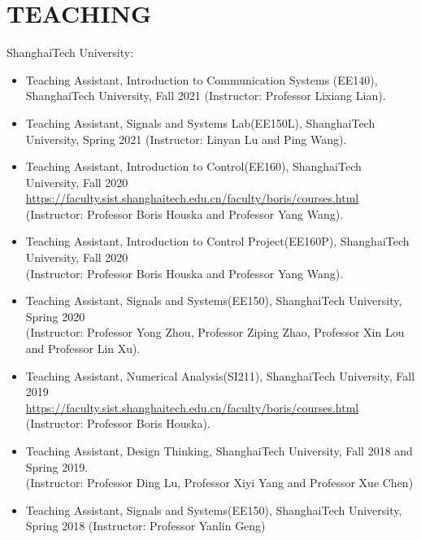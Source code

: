 \documentclass[paper=a4,fontsize=11pt]{scrartcl} %
\newlength{\spacebox}
\newcommand{\NewPart}[1]{\section*{\uppercase{#1}}}
\newcommand{\PersonalEntry}[2]{
	\noindent\hangindent=2em\hangafter=0 %
	\parbox{\spacebox}{        %
		\textit{#1}}		       %
	\hspace{1.5em} #2 \par}    %
\newcommand{\SkillsEntry}[2]{      %
	\noindent\hangindent=2em\hangafter=0 %
	\parbox{\spacebox}{        %
		\textit{#1}}			   %
	\hspace{1.5em} #2 \par}    %
\begin{document}
			\NewPart{Teaching}
			
			ShanghaiTech University:
			\begin{itemize}
				
				
				\item{Teaching Assistant, 	Introduction to Communication Systems (EE140), ShanghaiTech University, Fall 2021 (Instructor: Professor Lixiang Lian).}
				
				\item{Teaching Assistant, Signals and Systems Lab(EE150L), ShanghaiTech University, Spring 2021 (Instructor: Linyan Lu and Ping Wang).}
				
				\item{Teaching Assistant, Introduction to Control(EE160), ShanghaiTech University, Fall 2020\\ 
					\url{https://faculty.sist.shanghaitech.edu.cn/faculty/boris/courses.html}\\
					(Instructor: Professor Boris Houska and Professor Yang Wang).
				}
				
				\item{Teaching Assistant, Introduction to Control Project(EE160P), ShanghaiTech University, Fall 2020\\ (Instructor: Professor Boris Houska and Professor Yang Wang).}
				
				\item{Teaching Assistant, Signals and Systems(EE150),  ShanghaiTech University, Spring 2020 \\ (Instructor: Professor Yong Zhou, Professor Ziping Zhao, Professor Xin Lou and Professor Lin Xu).}
				
				\item{Teaching Assistant, Numerical Analysis(SI211), ShanghaiTech University, Fall 2019\\ 
					\url{https://faculty.sist.shanghaitech.edu.cn/faculty/boris/courses.html}\\
					(Instructor: Professor Boris Houska).
				}
				
				\item{Teaching Assistant, Design Thinking, ShanghaiTech University, Fall 2018 and Spring 2019.\\ (Instructor: Professor Ding Lu, Professor Xiyi Yang and Professor Xue Chen) }
				
				\item{Teaching Assistant, Signals and Systems(EE150),  ShanghaiTech University, Spring 2018 (Instructor: Professor Yanlin Geng)
					
				}
				
				
				
			\end{itemize}
			
\end{document}
